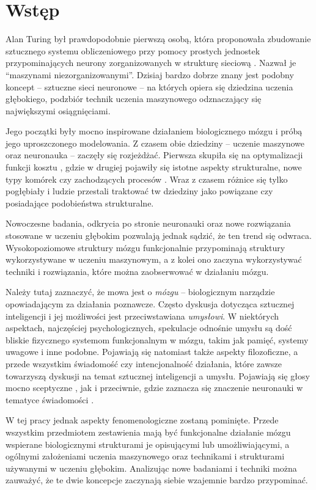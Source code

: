 \chapter*{Wstęp}

Alan Turing był prawdopodobnie pierwszą osobą, która proponowała zbudowanie sztucznego systemu obliczeniowego przy pomocy prostych jednostek przypominających neurony zorganizowanych w strukturę sieciową \cite{turing1969intelligent}.
Nazwał je ``maszynami niezorganizowanymi''.
Dzisiaj bardzo dobrze znany jest podobny koncept -- sztuczne sieci neuronowe -- na których opiera się dziedzina uczenia głębokiego, podzbiór technik uczenia maszynowego odznaczający się największymi osiągnięciami.

Jego początki były mocno inspirowane działaniem biologicznego mózgu i próbą jego uproszczonego modelowania.
Z czasem obie dziedziny -- uczenie maszynowe oraz neuronauka -- zaczęły się rozjeżdżać.
Pierwsza skupiła się na optymalizacji funkcji kosztu \cite{sutskever2013importance}, gdzie w drugiej pojawiły się istotne aspekty strukturalne, nowe typy komórek czy zachodzących procesów \cite{solari2011cognitive}.
Wraz z czasem różnice się tylko pogłębiały i ludzie przestali traktować tw dziedziny jako powiązane czy posiadające podobieństwa strukturalne.

Nowoczesne badania, odkrycia po stronie neuronauki oraz nowe rozwiązania stosowane w uczeniu głębokim pozwalają jednak sądzić, że ten trend się odwraca.
Wysokopoziomowe struktury mózgu funkcjonalnie przypominają struktury wykorzystywane w uczeniu maszynowym, a z kolei ono zaczyna wykorzystywać techniki i rozwiązania, które można zaobserwować w działaniu mózgu.

Należy tutaj zaznaczyć, że mowa jest o \emph{mózgu} -- biologicznym narządzie opowiadającym za działania poznawcze.
Często dyskusja dotycząca sztucznej inteligencji i jej możliwości jest przeciwstawiana \emph{umysłowi}.
W niektórych aspektach, najczęściej psychologicznych, spekulacje odnośnie umysłu są dość bliskie fizycznego systemom funkcjonalnym w mózgu, takim jak pamięć, systemy uwagowe i inne podobne.
Pojawiają się natomiast także aspekty filozoficzne, a przede wszystkim świadomość czy intencjonalność działania, które zawsze towarzyszą dyskusji na temat sztucznej inteligencji a umysłu.
Pojawiają się głosy mocno sceptyczne \cite{searle1980minds}, jak i przeciwnie, gdzie zaznacza się znaczenie neuronauki w tematyce świadomości \cite{reggia2013rise}.

W tej pracy jednak aspekty fenomenologiczne zostaną pominięte.
Przede wszystkim przedmiotem zestawienia mają być funkcjonalne działanie mózgu wspierane biologicznymi strukturami je opisującymi lub umożliwiającymi, a ogólnymi założeniami uczenia maszynowego oraz technikami i strukturami używanymi w uczeniu głębokim.
Analizując nowe badaniami i techniki można zauważyć, że te dwie koncepcje zaczynają siebie wzajemnie bardzo przypominać.

